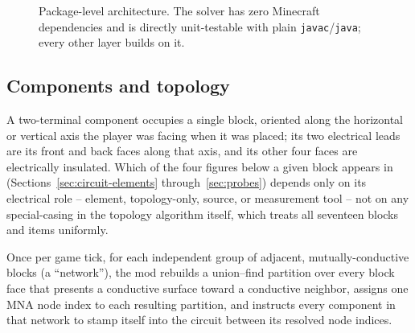 \begin{figure}[htbp]
\caption{Package-level architecture. The solver has zero Minecraft dependencies and is
directly unit-testable with plain \texttt{javac}/\texttt{java}; every other layer builds on
it.}
\label{fig:architecture}
\end{figure}

\subsection{Components and topology}

A two-terminal component occupies a single block, oriented along the horizontal or vertical
axis the player was facing when it was placed; its two electrical leads are its front and
back faces along that axis, and its other four faces are electrically insulated. Which of the
four figures below a given block appears in (Sections~\ref{sec:circuit-elements}
through~\ref{sec:probes}) depends only on its electrical role -- element, topology-only,
source, or measurement tool -- not on any special-casing in the topology algorithm itself,
which treats all seventeen blocks and items uniformly.

Once per game tick, for each independent group of adjacent, mutually-conductive blocks
(a ``network''), the mod rebuilds a union--find partition over every block face that
presents a conductive surface toward a conductive neighbor, assigns one MNA node index to
each resulting partition, and instructs every component in that network to stamp itself
into the circuit between its resolved node indices.


